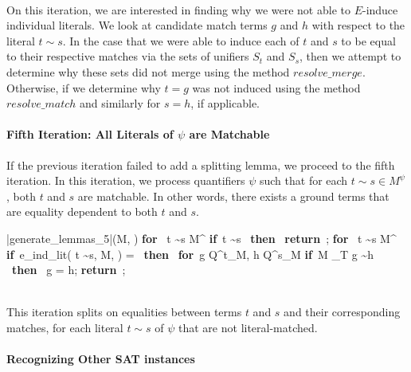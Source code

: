 \documentclass{llncs}
\def\IF{\qtab\keyword{if}\ }
\def\THEN{\ \keyword{then}\ }
\def\FI{\untab}
\def\RETURN{\keyword{return}\ }
\def\ENDPROC{\untab}
\def\DOFOR{\qtab\keyword{for}\ }
\def\ENDFOR{\untab}
\def\keyword#1{\mbox{\normalshape\bf #1}}
\begin{document}
\ \\

On this iteration, we are interested in finding why we were not able to $E$-induce individual literals.
We look at candidate match terms $g$ and $h$ with respect to the literal $t \sim s$.
In the case that we were able to induce each of $t$ and $s$ to be equal to their respective matches via the sets of unifiers $S_t$ and $S_s$, then we attempt to determine why these sets did not merge using the method $resolve\_merge$.
Otherwise, if we determine why $t = g$ was not induced using the method $resolve\_match$ and similarly for $s = h$, if applicable.

\paragraph{Fifth Iteration: All Literals of $\psi$ are Matchable}

If the previous iteration failed to add a splitting lemma, we proceed to the fifth iteration.
In this iteration, we process quantifiers $\psi$ such that for each $t \sim s \in M^\psi$, both $t$ and $s$ are matchable.
In other words, there exists a ground terms that are equality dependent to both $t$ and $s$.

\begin{minipage}[t]{.4\linewidth}
\begin{program}
\PROC |generate\_lemmas\_5|(M, \psi) \BODY
  \DOFOR {} t \sim s \in M^\psi
    \IF t \sim s  \THEN
      \RETURN;
    \FI
  \ENDFOR
  \DOFOR {} t \sim s \in M^\psi
    \IF e\_ind\_lit( t \sim s, M, \psi ) = \emptyset \THEN
      \DOFOR g \in Q^t_M, h \in Q^s_M
        \IF M \not\models_T g \sim h \THEN
           g = h;
        \FI
      \ENDFOR
    \FI
  \ENDFOR
  \RETURN;
\ENDPROC
\end{program}
\end{minipage}

\ \\

This iteration splits on equalities between terms $t$ and $s$ and their corresponding matches, for each literal $t \sim s$ of $\psi$ that are not literal-matched.

\paragraph{Recognizing Other SAT instances}
\end{document}
